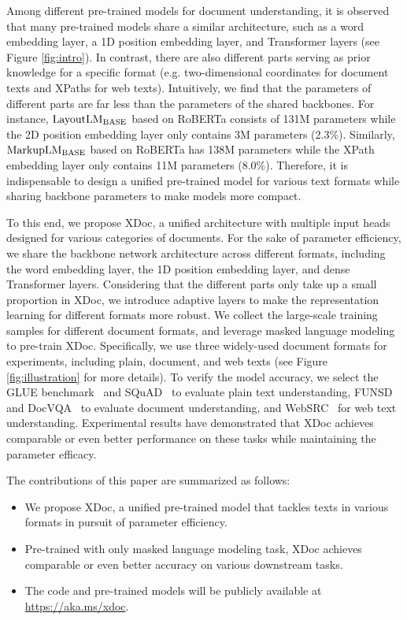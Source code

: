 \documentclass[11pt]{article}
\begin{document}
Among different pre-trained models for document understanding, it is observed that many pre-trained models share a similar architecture, such as a word embedding layer, a 1D position embedding layer, and Transformer layers (see Figure \ref{fig:intro}). In contrast, there are also different parts serving as prior knowledge for a specific format (e.g. two-dimensional coordinates for document texts and XPaths for web texts). Intuitively, we find that the parameters of different parts are far less than the parameters of the shared backbones. For instance, ${\rm LayoutLM_{BASE}}$ \cite{xu2020layoutlm} based on RoBERTa \cite{liu2019roberta} consists of 131M parameters while the 2D position embedding layer only contains 3M parameters (2.3\%). Similarly, ${\rm MarkupLM_{BASE}}$ \cite{li2021markuplm} based on RoBERTa has 138M parameters while the XPath embedding layer only contains 11M parameters (8.0\%). Therefore, it is indispensable to design a unified pre-trained model for various text formats while sharing backbone parameters to make models more compact. 

To this end, we propose XDoc, a unified architecture with multiple input heads designed for various categories of documents. For the sake of parameter efficiency, we share the backbone network architecture across different formats, including the word embedding layer, the 1D position embedding layer, and dense Transformer layers. Considering that the different parts only take up a small proportion in XDoc, we introduce adaptive layers to make the representation learning for different formats more robust. We collect the large-scale training samples for different document formats, and leverage masked language modeling to pre-train XDoc. Specifically, we use three widely-used document formats for experiments, including plain, document, and web texts (see Figure \ref{fig:illustration} for more details). To verify the model accuracy, we select the GLUE benchmark~\citep{wang2018glue} and SQuAD~\cite{rajpurkar2016squad,rajpurkar2018know} to evaluate plain text understanding, FUNSD~\cite{jaume2019funsd} and DocVQA~\cite{mathew2021docvqa} to evaluate document understanding, and WebSRC~\cite{chen2021websrc} for web text understanding. Experimental results have demonstrated that XDoc achieves comparable or even better performance on these tasks while maintaining the parameter efficacy.

The contributions of this paper are summarized as follows:

\begin{itemize}
    \item We propose XDoc, a unified pre-trained model that tackles texts in various formats in pursuit of parameter efficiency.
    \item Pre-trained with only masked language modeling task, XDoc achieves comparable or even better accuracy on various downstream tasks.
    \item The code and pre-trained models will be publicly available at \url{https://aka.ms/xdoc}.
\end{itemize}
\end{document}
